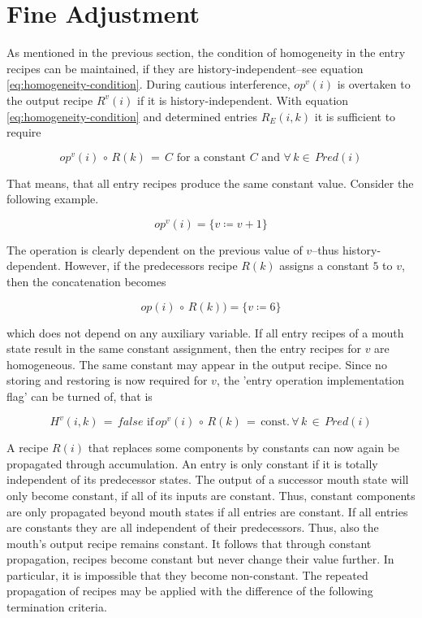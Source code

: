 \documentclass[12pt,a4paper]{scrartcl}
\begin{document}
%
\section{Fine Adjustment}

As mentioned in the previous section, the condition of homogeneity in the entry
recipes can be maintained, if they are history-independent--see equation
\ref{eq:homogeneity-condition}.  During cautious interference, $op^v(i)$ is
overtaken to the output recipe $R^v(i)$ if it is history-independent.  With equation
\ref{eq:homogeneity-condition} and determined entries $R_E(i,k)$ it is
sufficient to require 

\begin{equation} \label{eq:homogeneity-condition-2}
    op^v(i)\,\circ\,R(k)\,=\,C\,\,\mbox{for a constant $C$ and } \forall\,k\in\,Pred(i)
\end{equation}

That means, that all entry recipes produce the same constant value. Consider
the following example.

\begin{equation}
    op^v(i) = \{ v \coloneqq  v + 1 \}
\end{equation}

The operation is clearly dependent on the previous value of $v$--thus 
history-dependent. However, if the predecessors recipe $R(k)$ assigns a constant $5$ to
$v$, then the concatenation becomes

\begin{equation}
    op(i)\,\circ\,R(k)) = \{ v \coloneqq  6 \}
\end{equation}

which does not depend on any auxiliary variable. If all entry recipes of a
mouth state result in the same constant assignment, then the entry recipes for
$v$ are homogeneous.  The same constant may appear in the output recipe. Since
no storing and restoring is now required for $v$, the 'entry operation
implementation flag' can be turned of, that is

\begin{equation}
    H^v(i,k)\,=\,false\,\,\mbox{if}\,op^v(i)\,\circ\,R(k)\,=\,\mbox{const.}\,\forall\,k\,\in\,Pred(i)
\end{equation}

A recipe $R(i)$ that replaces some components by constants can now again be
propagated through accumulation. An entry is only constant if it is totally
independent of its predecessor states. The output of a successor mouth state
will only become constant, if all of its inputs are constant. Thus, constant
components are only propagated beyond mouth states if all entries are constant.
If all entries are constants they are all independent of their predecessors.
Thus, also the mouth's output recipe remains constant. It follows that through
constant propagation, recipes become constant but never change their value
further.  In particular, it is impossible that they become non-constant.
The repeated propagation of recipes may be applied with the difference of the
following termination criteria.
\end{document}
